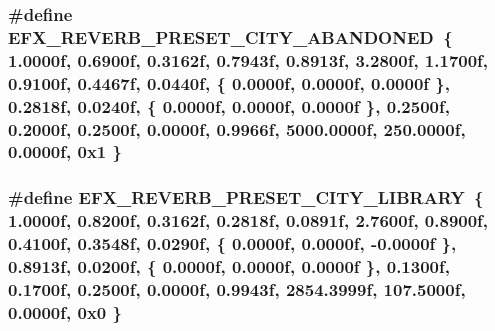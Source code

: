 \subsubsection[{\texorpdfstring{E\+F\+X\+\_\+\+R\+E\+V\+E\+R\+B\+\_\+\+P\+R\+E\+S\+E\+T\+\_\+\+C\+I\+T\+Y\+\_\+\+A\+B\+A\+N\+D\+O\+N\+ED}{EFX_REVERB_PRESET_CITY_ABANDONED}}]{\setlength{\rightskip}{0pt plus 5cm}\#define E\+F\+X\+\_\+\+R\+E\+V\+E\+R\+B\+\_\+\+P\+R\+E\+S\+E\+T\+\_\+\+C\+I\+T\+Y\+\_\+\+A\+B\+A\+N\+D\+O\+N\+ED~\{ 1.\+0000f, 0.\+6900f, 0.\+3162f, 0.\+7943f, 0.\+8913f, 3.\+2800f, 1.\+1700f, 0.\+9100f, 0.\+4467f, 0.\+0440f, \{ 0.\+0000f, 0.\+0000f, 0.\+0000f \}, 0.\+2818f, 0.\+0240f, \{ 0.\+0000f, 0.\+0000f, 0.\+0000f \}, 0.\+2500f, 0.\+2000f, 0.\+2500f, 0.\+0000f, 0.\+9966f, 5000.\+0000f, 250.\+0000f, 0.\+0000f, 0x1 \}}\hypertarget{efx-presets_8h_aa925be10a695b71b4e10175ea5a1e1e0}{}\label{efx-presets_8h_aa925be10a695b71b4e10175ea5a1e1e0}
\subsubsection[{\texorpdfstring{E\+F\+X\+\_\+\+R\+E\+V\+E\+R\+B\+\_\+\+P\+R\+E\+S\+E\+T\+\_\+\+C\+I\+T\+Y\+\_\+\+L\+I\+B\+R\+A\+RY}{EFX_REVERB_PRESET_CITY_LIBRARY}}]{\setlength{\rightskip}{0pt plus 5cm}\#define E\+F\+X\+\_\+\+R\+E\+V\+E\+R\+B\+\_\+\+P\+R\+E\+S\+E\+T\+\_\+\+C\+I\+T\+Y\+\_\+\+L\+I\+B\+R\+A\+RY~\{ 1.\+0000f, 0.\+8200f, 0.\+3162f, 0.\+2818f, 0.\+0891f, 2.\+7600f, 0.\+8900f, 0.\+4100f, 0.\+3548f, 0.\+0290f, \{ 0.\+0000f, 0.\+0000f, -\/0.\+0000f \}, 0.\+8913f, 0.\+0200f, \{ 0.\+0000f, 0.\+0000f, 0.\+0000f \}, 0.\+1300f, 0.\+1700f, 0.\+2500f, 0.\+0000f, 0.\+9943f, 2854.\+3999f, 107.\+5000f, 0.\+0000f, 0x0 \}}\hypertarget{efx-presets_8h_a1eb92f39ddc21de882008a114afd6a5a}{}\label{efx-presets_8h_a1eb92f39ddc21de882008a114afd6a5a}
